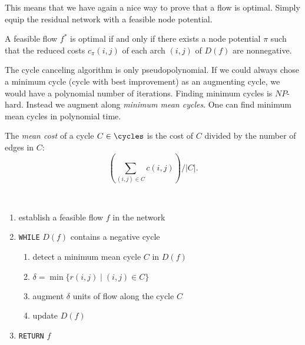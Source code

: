   
This means that we have again a nice way to prove that a flow is
optimal. Simply equip  the residual network with a feasible node
potential.  



\begin{corollary}
  \label{co:1}
  A feasible flow $f^*$ is optimal if and only if there exists a node
  potential $\pi$ such that the reduced costs $c_\pi{(i,j)}$ of  each arch
  $(i,j)$ of $D(f)$ are nonnegative. 
\end{corollary}






  The cycle canceling algorithm is only pseudopolynomial. If we could
  always chose a minimum cycle (cycle with best improvement) as an
  augmenting cycle, we would have a polynomial number of
  iterations. Finding minimum cycles is $NP$-hard. Instead we augment
  along \emph{minimum mean cycles}. One can find minimum mean cycles
  in polynomial time.  

  The \emph{mean cost} of a cycle $C \in \cycles$ is the cost of $C$
  divided by the number of edges in $C$:
  \begin{displaymath}
    (\sum_{(i,j) \in C} c{(i,j)})  / |C|.
  \end{displaymath}
  

  \begin{algorithm}
    \label{alg:2}
    ~\\
    \begin{enumerate}
    \item establish a feasible flow $f$ in the network
    \item {\tt WHILE} $D(f)$ contains a negative cycle
      \begin{enumerate}
      \item  detect a minimum mean cycle $C$ in $D(f)$ 
      \item   $\delta=\min\{r{(i,j)} \mid (i,j) \in C\}$
      \item   augment $\delta$ units of flow along the cycle $C$
      \item   update $D(f)$ 
      \end{enumerate}
    \item {\tt RETURN} $f$
    \end{enumerate}
  \end{algorithm}

  




